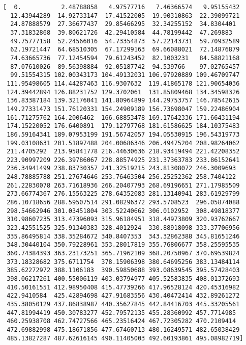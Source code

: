 \documentclass[11pt]{article}
\begin{document}
    \begin{Verbatim}[commandchars=\\\{\}]
[  0.           2.48788858   4.97577716   7.46366574   9.95155432
  12.43944289  14.92733147  17.41522005  19.90310863  22.39099721
  24.87888579  27.36677437  29.85466295  32.34255152  34.8304401
  37.31832868  39.80621726  42.29410584  44.78199442  47.269883
  49.75777158  52.24566016  54.73354873  57.22143731  59.70932589
  62.19721447  64.68510305  67.17299163  69.66088021  72.14876879
  74.63665736  77.12454594  79.61243452  82.1003231   84.58821168
  87.07610026  89.56398884  92.05187742  94.539766    97.02765457
  99.51554315 102.00343173 104.49132031 106.97920889 109.46709747
 111.95498605 114.44287463 116.9307632  119.41865178 121.90654036
 124.39442894 126.88231752 129.3702061  131.85809468 134.34598326
 136.83387184 139.32176041 141.80964899 144.29753757 146.78542615
 149.27331473 151.76120331 154.24909189 156.73698047 159.22486904
 161.71275762 164.2006462  166.68853478 169.17642336 171.66431194
 174.15220052 176.6400891  179.12797768 181.61586625 184.10375483
 186.59164341 189.07953199 191.56742057 194.05530915 196.54319773
 199.03108631 201.51897488 204.00686346 206.49475204 208.98264062
 211.4705292  213.95841778 216.44630636 218.93419494 221.42208352
 223.90997209 226.39786067 228.88574925 231.37363783 233.86152641
 236.34941499 238.83730357 241.32519215 243.81308072 246.3009693
 248.78885788 251.27674646 253.76463504 256.25252362 258.7404122
 261.22830078 263.71618936 266.20407793 268.69196651 271.17985509
 273.66774367 276.15563225 278.64352083 281.13140941 283.61929799
 286.10718656 288.59507514 291.08296372 293.5708523  296.05874088
 298.54662946 301.03451804 303.52240662 306.0102952  308.49818377
 310.98607235 313.47396093 315.96184951 318.44973809 320.93762667
 323.42551525 325.91340383 328.4012924  330.88918098 333.37706956
 335.86495814 338.35284672 340.8407353  343.32862388 345.81651246
 348.30440104 350.79228961 353.28017819 355.76806677 358.25595535
 360.74384393 363.23173251 365.71962109 368.20750967 370.69539824
 373.18328682 375.6711754  378.15906398 380.64695256 383.13484114
 385.62272972 388.1106183  390.59850688 393.08639545 395.57428403
 398.06217261 400.55006119 403.03794977 405.52583835 408.01372693
 410.50161551 412.98950408 415.47739266 417.96528124 420.45316982
 422.9410584  425.42894698 427.91683556 430.40472414 432.89261272
 435.38050129 437.86838987 440.35627845 442.84416703 445.33205561
 447.81994419 450.30783277 452.79572135 455.28360992 457.7714985
 460.25938708 462.74727566 465.23516424 467.72305282 470.2109414
 472.69882998 475.18671856 477.67460713 480.16249571 482.65038429
 485.13827287 487.62616145 490.11405003 492.60193861 495.08982719]

    \end{Verbatim}
\end{document}
